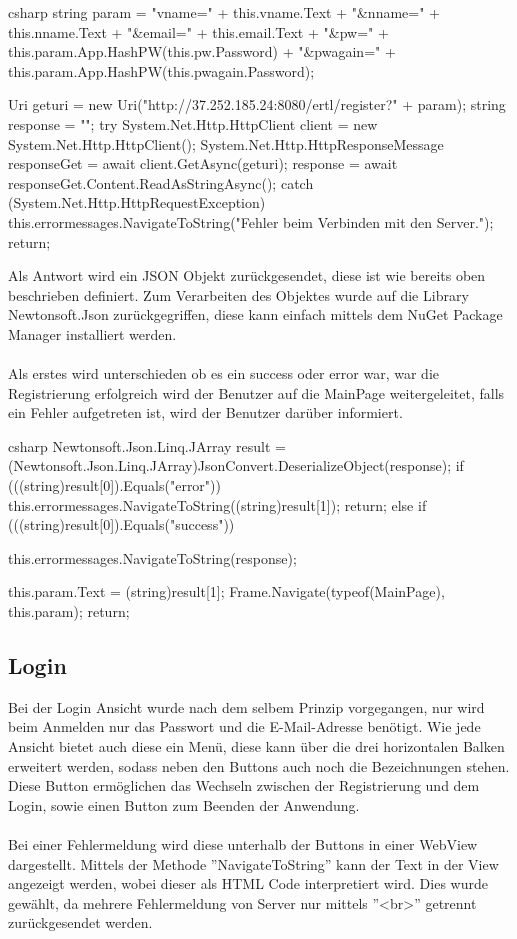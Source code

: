 \begin{code}{csharp}
	string param = "vname=" + this.vname.Text + "&nname=" + this.nname.Text + "&email=" + this.email.Text + "&pw=" + this.param.App.HashPW(this.pw.Password) + "&pwagain=" + this.param.App.HashPW(this.pwagain.Password);
	
	Uri geturi = new Uri("http://37.252.185.24:8080/ertl/register?" + param);
	string response = "";
	try
	{
		System.Net.Http.HttpClient client = new System.Net.Http.HttpClient();
		System.Net.Http.HttpResponseMessage responseGet = await client.GetAsync(geturi);
		response = await responseGet.Content.ReadAsStringAsync();
	}
	catch (System.Net.Http.HttpRequestException)
	{
		this.errormessages.NavigateToString("Fehler beim Verbinden mit den Server.");
		return;
	}
\end{code}

Als Antwort wird ein JSON Objekt zurückgesendet, diese ist wie bereits oben beschrieben definiert. Zum Verarbeiten des Objektes wurde auf die Library Newtonsoft.Json zurückgegriffen, diese kann einfach mittels dem NuGet Package Manager installiert werden.
\\\\
Als erstes wird unterschieden ob es ein success oder error war, war die Registrierung erfolgreich wird der Benutzer auf die MainPage weitergeleitet, falls ein Fehler aufgetreten ist, wird der Benutzer darüber informiert.

\begin{code}{csharp}
Newtonsoft.Json.Linq.JArray result = (Newtonsoft.Json.Linq.JArray)JsonConvert.DeserializeObject(response);
if (((string)result[0]).Equals("error"))
{
	this.errormessages.NavigateToString((string)result[1]);
	return;
}
else if (((string)result[0]).Equals("success"))
{
	this.errormessages.NavigateToString(response);
	
	this.param.Text = (string)result[1];
	Frame.Navigate(typeof(MainPage), this.param);
	return;
}
\end{code}

\subsection{Login}

Bei der Login Ansicht wurde nach dem selbem Prinzip vorgegangen, nur wird beim Anmelden nur das Passwort und die E-Mail-Adresse benötigt. Wie jede Ansicht bietet auch diese ein Menü, diese kann über die drei horizontalen Balken erweitert werden, sodass neben den Buttons auch noch die Bezeichnungen stehen. Diese Button ermöglichen das Wechseln zwischen der Registrierung und dem Login, sowie einen Button zum Beenden der Anwendung. 
\\\\
Bei einer Fehlermeldung wird diese unterhalb der Buttons in einer WebView dargestellt. Mittels der Methode ''NavigateToString'' kann der Text in der View angezeigt werden, wobei dieser als HTML Code interpretiert wird. Dies wurde gewählt, da mehrere Fehlermeldung von Server nur mittels ''<br>'' getrennt zurückgesendet werden.

